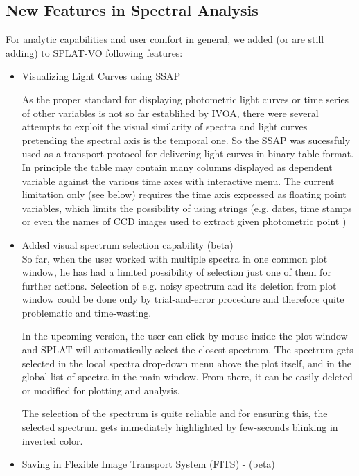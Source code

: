 \documentclass[final,authoryear,5p,times,twocolumn]{elsarticle}
\begin{document}
\subsection{New Features in Spectral Analysis}

For analytic capabilities and user comfort in general, we added (or are still adding) to SPLAT-VO following features:

\begin{itemize}

\item Visualizing Light Curves using  SSAP 

As the proper standard for displaying photometric light curves or time series
of other variables is not so far establihed by IVOA, there were several
attempts to exploit the visual  similarity of spectra and light curves
pretending the spectral axis is the temporal one.  So the SSAP was sucessfuly
used as a transport protocol for delivering light curves in binary table
format. In principle the table may contain many columns displayed as dependent
variable against the various time axes with interactive menu.  The current
limitation only (see below) requires the time axis expressed as floating point
variables, which limits the possibility of using strings (e.g. dates, time
stamps or even the names of CCD images used to extract given photometric point
)  

\item Added visual spectrum selection capability (beta)\\

So far, when the user worked with multiple spectra in one common plot window, he has had a limited possibility of selection just one of them for further actions. Selection of e.g. noisy spectrum and its deletion from plot window could be done only by trial-and-error procedure and therefore quite problematic and time-wasting.

In the upcoming version, the user can click by mouse inside the plot window and SPLAT will automatically select the closest spectrum. The spectrum gets selected in the local spectra drop-down menu above the plot itself, and in the global list of spectra in the main window. From there, it can be easily deleted or modified for plotting and analysis.

The selection of the spectrum is quite reliable and for ensuring this, the selected spectrum gets immediately highlighted by few-seconds blinking in inverted color.

\item Saving in Flexible Image Transport System (FITS) - (beta)\\


\end{itemize}
\end{document}
